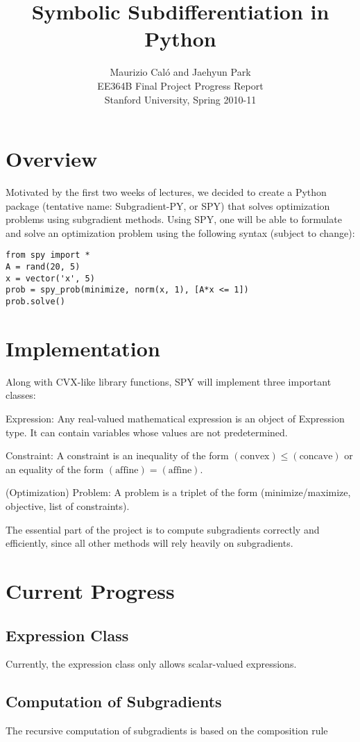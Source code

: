 \documentclass[12pt]{article}
\title{Symbolic Subdifferentiation in Python}
\author{Maurizio Cal\'o and Jaehyun Park\\
EE364B Final Project Progress Report\\
Stanford University, Spring 2010-11}
\begin{document}
\maketitle

\section{Overview}
Motivated by the first two weeks of lectures, we decided to create a
Python package (tentative name: Subgradient-PY, or SPY) that solves
optimization problems using subgradient methods. Using SPY, one will
be able to formulate and solve an optimization problem using the
following syntax (subject to change):
\begin{verbatim}
from spy import *
A = rand(20, 5)
x = vector('x', 5)
prob = spy_prob(minimize, norm(x, 1), [A*x <= 1])
prob.solve()
\end{verbatim}

\section{Implementation}
Along with CVX-like library functions, SPY will implement three
important classes:
\BIT
\item Expression: Any real-valued mathematical expression is an object
of Expression type. It can contain variables whose values are not
predetermined.
\item Constraint: A constraint is an inequality of the form
$(\text{convex}) \le (\text{concave})$ or an equality of the form
$(\text{affine}) = (\text{affine})$.
\item (Optimization) Problem: A problem is a triplet of the form (minimize/maximize, objective, list of constraints).
\EIT

The essential part of the project is to compute subgradients correctly
and efficiently, since all other methods will rely heavily on subgradients.

\section{Current Progress}
\subsection{Expression Class}
Currently, the expression class only allows scalar-valued expressions.

\subsection{Computation of Subgradients}
The recursive computation of subgradients is based on the composition rule
\end{document}
